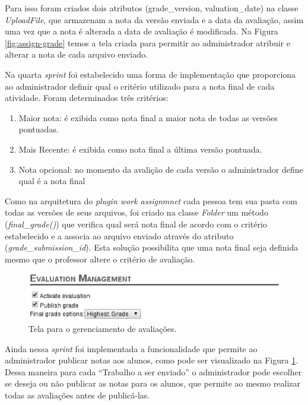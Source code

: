 Para isso foram criados dois atributos (grade\_version, valuation\_date) na classe \textit{UploadFile}, que armazenam a nota da versão enviada e a data da avaliação, assim uma vez que a nota é alterada a data de avaliação é modificada. Na Figura \ref{fig:assign-grade} temos a tela criada para permitir ao administrador atribuir e alterar a nota de cada arquivo enviado.

Na quarta \textit{sprint} foi estabelecido uma forma de implementação que proporciona ao administrador definir qual o critério utilizado para a nota final de cada atividade. Foram determinados três critérios:
\begin{enumerate}
\item Maior nota: é exibida como nota final a maior nota de todas as versões pontuadas.
\item Mais Recente: é exibida como nota final a última versão pontuada.
\item Nota opcional: no momento da avalição de cada versão o administrador define qual é a nota final
\end{enumerate}

Como na arquitetura do \textit{plugin work assignmnet} cada pessoa tem sua pasta com todas as versões de seus arquivos, foi criado na classe \textit{Folder} um método (\textit{final\_grade()}) que verifica qual será nota final de acordo com o critério estabelecido e a associa ao arquivo enviado através do atributo (\textit{grade\_submission\_id}). Esta solução possibilita que uma nota final seja definida mesmo que o professor altere o critério de avaliação.

\begin{figure}[h]
    \centering
    \includegraphics[keepaspectratio=true,scale=0.75]
      {figuras/evaluation-management.eps}
    \caption{Tela para o gerenciamento de avaliações.}
    \label{fig:evaluation-management}
\end{figure}

Ainda nessa \textit{sprint} foi implementada a funcionalidade que permite ao administrador publicar notas aos alunos, como pode ser visualizado na Figura \ref{fig:evaluation-management}. Dessa maneira para cada ``Trabalho a ser enviado'' o administrador pode escolher se deseja ou não publicar as notas para os alunos, que permite ao mesmo realizar todas as avaliações antes de publicá-las.

